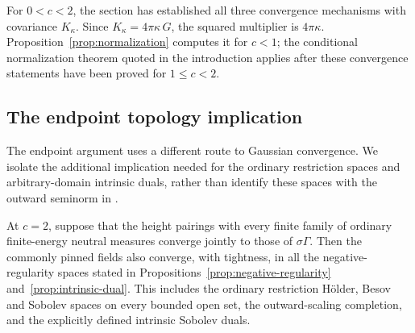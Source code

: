 For \(0<c<2\), the section has established all three convergence mechanisms with
covariance \(K_\kappa\). Since
\(K_\kappa=4\pi\kappa\,G\), the squared multiplier is
\(4\pi\kappa\). Proposition~\ref{prop:normalization} computes it for
\(c<1\); the conditional normalization theorem quoted in the
introduction applies after these convergence statements have been
proved for \(1\le c<2\).

\subsection{The endpoint topology implication}

The endpoint argument uses a different route to Gaussian convergence.
We isolate the additional implication needed for the ordinary restriction
spaces and arbitrary-domain intrinsic duals, rather than identify these
spaces with the outward seminorm in \cite{DKLM2026}.

\begin{proposition}\label{prop:endpoint-topologies}
At \(c=2\), suppose that the height pairings with every finite family
of ordinary finite-energy neutral measures converge jointly to those
of \(\sigma\Gamma\). Then the commonly pinned fields also converge,
with tightness, in all the negative-regularity spaces stated in
Propositions~\ref{prop:negative-regularity} and~\ref{prop:intrinsic-dual}.
This includes the ordinary restriction H\"older, Besov and Sobolev
spaces on every bounded open set, the outward-scaling completion,
and the explicitly defined intrinsic Sobolev duals.
\end{proposition}


